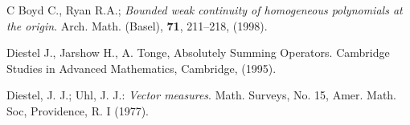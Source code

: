 \documentclass[12 pt]{article}%
\newtheorem{final remark}[theorem]{Final Remark}
\begin{document}
\begin{thebibliography}{C}
	 Boyd C., Ryan R.A.; {\it Bounded weak continuity of homogeneous polynomials at the origin}. Arch. Math. (Basel), {\bf 71}, 211–218, (1998).
	
	
	
	
	
	
	
	 Diestel J., Jarshow H., A. Tonge, Absolutely Summing Operators. Cambridge Studies in Advanced Mathematics, Cambridge, (1995).
	
	  Diestel, J. J.; Uhl, J. J.: {\it Vector measures}. Math. Surveys, No. 15, Amer. Math. Soc, Providence, R. I (1977).
	
	
	
	

\end{thebibliography}
\end{document}
